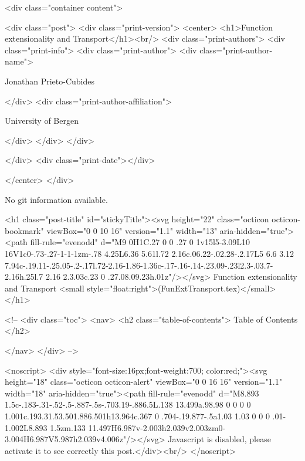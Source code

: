       <div class="container content">
        







<div class="post">
  <div class="print-version">
    <center>
      <h1>Function extensionality and Transport</h1><br/>
        <div class="print-authors">
          <div class="print-info">
            <div class="print-author">
              <div class="print-author-name">
                
                  Jonathan Prieto-Cubides
                
              </div>
              <div class="print-author-affiliation">
                
                  University of Bergen
                
                </div>
            </div>
          </div>
          
          
        </div>
        <div class="print-date"></div>
        
        
    </center>
  </div>

  
  No git information available.
  

  <h1 class="post-title" id="stickyTitle"><svg height="22" class="octicon octicon-bookmark" viewBox="0 0 10 16" version="1.1" width="13" aria-hidden="true"><path fill-rule="evenodd" d="M9 0H1C.27 0 0 .27 0 1v15l5-3.09L10 16V1c0-.73-.27-1-1-1zm-.78 4.25L6.36 5.61l.72 2.16c.06.22-.02.28-.2.17L5 6.6 3.12 7.94c-.19.11-.25.05-.2-.17l.72-2.16-1.86-1.36c-.17-.16-.14-.23.09-.23l2.3-.03.7-2.16h.25l.7 2.16 2.3.03c.23 0 .27.08.09.23h.01z"/></svg> Function extensionality and Transport <small style="float:right">(FunExtTransport.tex)</small>
  </h1>

  <!-- 
  <div class="toc">
    <nav>
    <h2 class="table-of-contents"> Table of Contents </h2>
      

    </nav>
  </div>
   -->

  <noscript>
  <div style="font-size:16px;font-weight:700; color:red;"><svg height="18" class="octicon octicon-alert" viewBox="0 0 16 16" version="1.1" width="18" aria-hidden="true"><path fill-rule="evenodd" d="M8.893 1.5c-.183-.31-.52-.5-.887-.5s-.703.19-.886.5L.138 13.499a.98.98 0 0 0 0 1.001c.193.31.53.501.886.501h13.964c.367 0 .704-.19.877-.5a1.03 1.03 0 0 0 .01-1.002L8.893 1.5zm.133 11.497H6.987v-2.003h2.039v2.003zm0-3.004H6.987V5.987h2.039v4.006z"/></svg> Javascript is disabled, please activate it to see correctly this post.</div><br/>
  </noscript>

